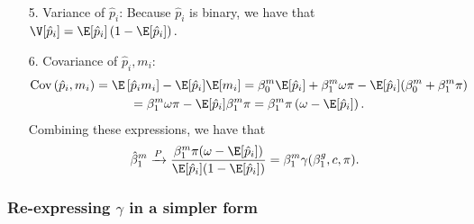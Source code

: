 \documentclass[12pt]{article}
\begin{document}
\begin{itemize}
\begin{multline*}
\end{multline*}
\item[5.] Variance of $\hat{p}_i$: Because $\hat{p}_i$ is binary, we have that $\V[\hat{p}_i] = \E[\hat{p}_i]\left(1 - \E[\hat{p}_i]\right) .$
\item[6.] Covariance of $\hat{p}_i, m_i$:
\begin{multline*}
\textrm{Cov}\left(\hat{p}_i, m_i\right) = \E\left[\hat{p}_i m_i\right] - \E[\hat{p}_i] \E[m_i] = \beta^m_0 \E[\hat{p}_i] + \beta^m_1 \omega \pi - \E[\hat{p}_i]( \beta^m_0 + \beta^m_1 \pi)\\ = \beta^m_1 \omega \pi - \E[\hat{p}_i] \beta_1^m \pi = \beta^m_1 \pi \left( \omega - \E[\hat{p}_i]\right).
\end{multline*}
Combining these expressions, we have that
$$ \hat{\beta}^m_1 \xrightarrow{P} \frac{\beta^m_1 \pi (\omega - \E[\hat{p}_i])}{\E[\hat{p}_i](1 - \E[\hat{p}_i])} = \beta^m_1 \gamma(\beta^g_1, c, \pi).$$
\end{itemize}

\subsubsection{Re-expressing $\gamma$ in a simpler form}
\end{document}
